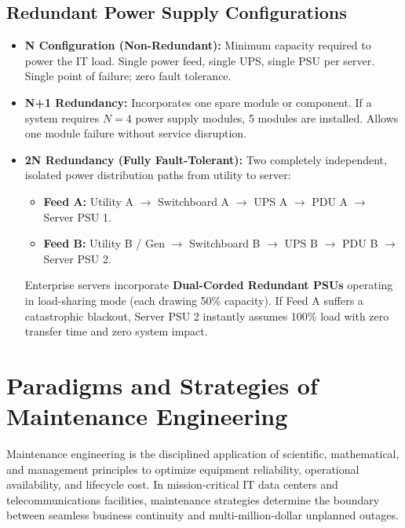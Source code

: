 \subsection{Redundant Power Supply Configurations}
\begin{itemize}[leftmargin=*]
    \item \textbf{N Configuration (Non-Redundant):} Minimum capacity required to power the IT load. Single power feed, single UPS, single PSU per server. Single point of failure; zero fault tolerance.
    \item \textbf{N+1 Redundancy:} Incorporates one spare module or component. If a system requires $N = 4$ power supply modules, 5 modules are installed. Allows one module failure without service disruption.
    \item \textbf{2N Redundancy (Fully Fault-Tolerant):} Two completely independent, isolated power distribution paths from utility to server:
    \begin{itemize}
        \item \textbf{Feed A:} Utility A $\rightarrow$ Switchboard A $\rightarrow$ UPS A $\rightarrow$ PDU A $\rightarrow$ Server PSU 1.
        \item \textbf{Feed B:} Utility B / Gen $\rightarrow$ Switchboard B $\rightarrow$ UPS B $\rightarrow$ PDU B $\rightarrow$ Server PSU 2.
    \end{itemize}
    Enterprise servers incorporate \textbf{Dual-Corded Redundant PSUs} operating in load-sharing mode (each drawing 50\% capacity). If Feed A suffers a catastrophic blackout, Server PSU 2 instantly assumes 100\% load with zero transfer time and zero system impact.
\end{itemize}

\section{Paradigms and Strategies of Maintenance Engineering}

Maintenance engineering is the disciplined application of scientific, mathematical, and management principles to optimize equipment reliability, operational availability, and lifecycle cost. In mission-critical IT data centers and telecommunications facilities, maintenance strategies determine the boundary between seamless business continuity and multi-million-dollar unplanned outages.

